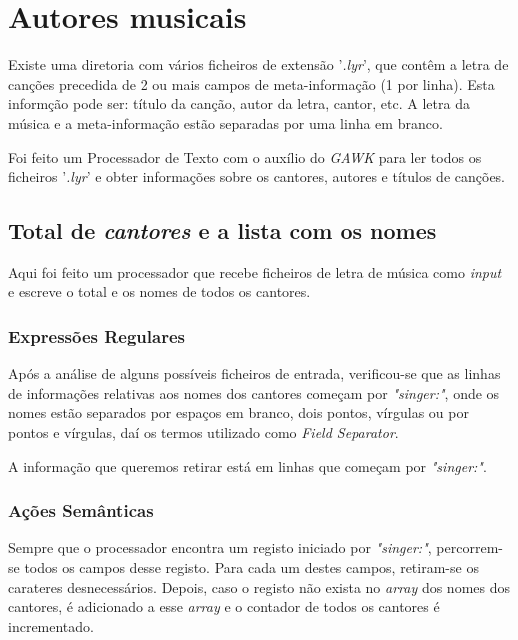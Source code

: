 \documentclass{article}
\begin{document}
\vspace{15}
\section{Autores musicais}

Existe uma diretoria com vários ficheiros de extensão '\emph{.lyr}', que contêm a letra de canções precedida de 2 ou mais campos de meta-informação (1 por linha). Esta informção pode ser: título da canção, autor da letra, cantor, etc. A letra da música e a meta-informação estão separadas por uma linha em branco.

Foi feito um Processador de Texto com o auxílio do \emph{GAWK} para ler todos os ficheiros '\emph{.lyr}' e obter informações sobre os cantores, autores e títulos de canções.

\subsection{Total de \emph{cantores} e a lista com os nomes}

Aqui foi feito um processador que recebe ficheiros de letra de música como \emph{input} e escreve o total e os nomes de todos os cantores.

\subsubsection{Expressões Regulares}

Após a análise de alguns possíveis ficheiros de entrada, verificou-se que as linhas de informações relativas aos nomes dos cantores começam por \emph{"singer:"}, onde os nomes estão separados por espaços em branco, dois pontos, vírgulas ou por pontos e vírgulas, daí os termos utilizado como \emph{Field Separator}.

A informação que queremos retirar está em linhas que começam por \emph{"singer:"}.

\subsubsection{Ações Semânticas}

Sempre que o processador encontra um registo iniciado por \emph{"singer:"}, percorrem-se todos os campos desse registo. Para cada um destes campos, retiram-se os carateres desnecessários. Depois, caso o registo não exista no \emph{array} dos nomes dos cantores, é adicionado a esse \emph{array} e o contador de todos os cantores é incrementado.
\end{document}
